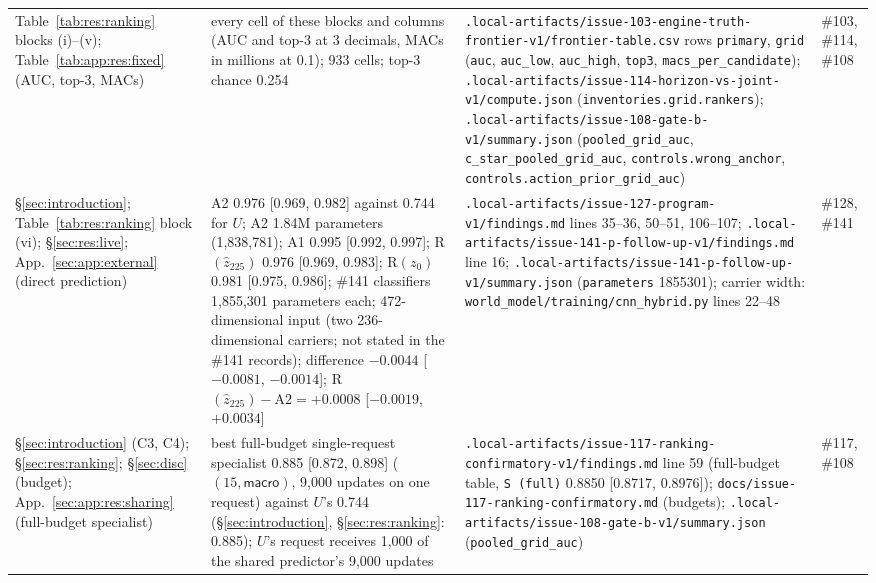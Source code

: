 {\begin{revblock}
\begin{longtable}{@{}>{\raggedright\arraybackslash}p{}>{\raggedright\arraybackslash}p{}>{\raggedright\arraybackslash}p{}>{\raggedright\arraybackslash}p{}@{}}
Table~\ref{tab:res:ranking} blocks (i)--(v); Table~\ref{tab:app:res:fixed} (AUC, top-3, MACs) & every cell of these blocks and columns (AUC and top-3 at 3 decimals, MACs in millions at 0.1); 933 cells; top-3 chance 0.254 & \nolinkurl{.local-artifacts/issue-103-engine-truth-frontier-v1/frontier-table.csv} rows \texttt{primary}, \texttt{grid} (\texttt{auc}, \texttt{auc\_low}, \texttt{auc\_high}, \texttt{top3}, \texttt{macs\_per\_candidate}); \nolinkurl{.local-artifacts/issue-114-horizon-vs-joint-v1/compute.json} (\nolinkurl{inventories.grid.rankers}); \nolinkurl{.local-artifacts/issue-108-gate-b-v1/summary.json} (\nolinkurl{pooled_grid_auc}, \nolinkurl{c_star_pooled_grid_auc}, \nolinkurl{controls.wrong_anchor}, \nolinkurl{controls.action_prior_grid_auc}) & \#103, \#114, \#108 \\
\S\ref{sec:introduction}; Table~\ref{tab:res:ranking} block (vi); \S\ref{sec:res:live}; App.~\ref{sec:app:external} (direct prediction) & A2 0.976 [0.969, 0.982] against 0.744 for $U$; A2 1.84M parameters (1,838,781); A1 0.995 [0.992, 0.997]; R$(\hat z_{225})$ 0.976 [0.969, 0.983]; R$(z_0)$ 0.981 [0.975, 0.986]; \#141 classifiers 1,855,301 parameters each; 472-dimensional input (two 236-dimensional carriers; not stated in the \#141 records); difference $-0.0044$ [$-0.0081$, $-0.0014$]; R$(\hat z_{225})-\text{A2}=+0.0008$ [$-0.0019$, $+0.0034$] & \nolinkurl{.local-artifacts/issue-127-program-v1/findings.md} lines 35--36, 50--51, 106--107; \nolinkurl{.local-artifacts/issue-141-p-follow-up-v1/findings.md} line 16; \nolinkurl{.local-artifacts/issue-141-p-follow-up-v1/summary.json} (\texttt{parameters} 1855301); carrier width: \nolinkurl{world_model/training/cnn_hybrid.py} lines 22--48 & \#128, \#141 \\
\S\ref{sec:introduction} (C3, C4); \S\ref{sec:res:ranking}; \S\ref{sec:disc} (budget); App.~\ref{sec:app:res:sharing} (full-budget specialist) & best full-budget single-request specialist 0.885 [0.872, 0.898] ($(15,\textsf{macro})$, 9,000 updates on one request) against $U$'s 0.744 (\S\ref{sec:introduction}, \S\ref{sec:res:ranking}: 0.885); $U$'s request receives 1,000 of the shared predictor's 9,000 updates & \nolinkurl{.local-artifacts/issue-117-ranking-confirmatory-v1/findings.md} line 59 (full-budget table, \texttt{S (full)} 0.8850 [0.8717, 0.8976]); \nolinkurl{docs/issue-117-ranking-confirmatory.md} (budgets); \nolinkurl{.local-artifacts/issue-108-gate-b-v1/summary.json} (\nolinkurl{pooled_grid_auc}) & \#117, \#108 \\

\end{longtable}
\end{revblock}}
